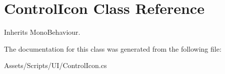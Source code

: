 \hypertarget{class_control_icon}{\section{Control\-Icon Class Reference}
\label{class_control_icon}
}


Inherits Mono\-Behaviour.



The documentation for this class was generated from the following file\-:\begin{DoxyCompactItemize}
\item 
Assets/\-Scripts/\-U\-I/Control\-Icon.\-cs\end{DoxyCompactItemize}
